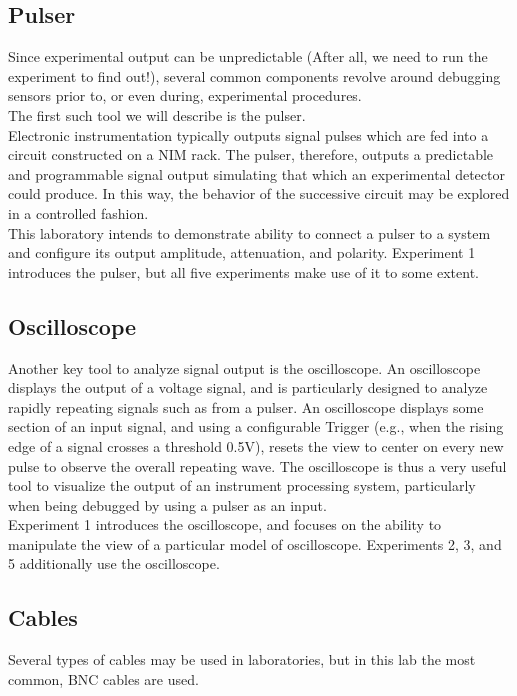 \documentclass[12pt]{article}
\begin{document}
\subsection{Pulser}
Since experimental output can be unpredictable (After all, we need to run the experiment to find out!), several common components revolve around debugging sensors prior to, or even during, experimental procedures.\\

The first such tool we will describe is the pulser.\\

Electronic instrumentation typically outputs signal pulses which are fed into a circuit constructed on a NIM rack.
The pulser, therefore, outputs a predictable and programmable signal output simulating that which an experimental detector could produce.
In this way, the behavior of the successive circuit may be explored in a controlled fashion.\\

This laboratory intends to demonstrate ability to connect a pulser to a system and configure its output amplitude, attenuation, and polarity.
Experiment 1 introduces the pulser, but all five experiments make use of it to some extent.
\\

\subsection{Oscilloscope}

Another key tool to analyze signal output is the oscilloscope.
An oscilloscope displays the output of a voltage signal, and is particularly designed to analyze rapidly repeating signals such as from a pulser. 
An oscilloscope displays some section of an input signal, and using a configurable Trigger (e.g., when the rising edge of a signal crosses a threshold 0.5V), resets the view to center on every new pulse to observe the overall repeating wave. 
The oscilloscope is thus a very useful tool to visualize the output of an instrument processing system, particularly when being debugged by using a pulser as an input.\\

Experiment 1 introduces the oscilloscope, and focuses on the ability to manipulate the view of a particular model of oscilloscope.
Experiments 2, 3, and 5 additionally use the oscilloscope.


\subsection{Cables}
Several types of cables may be used in laboratories, but in this lab the most common, BNC cables are used.\\
\end{document}
